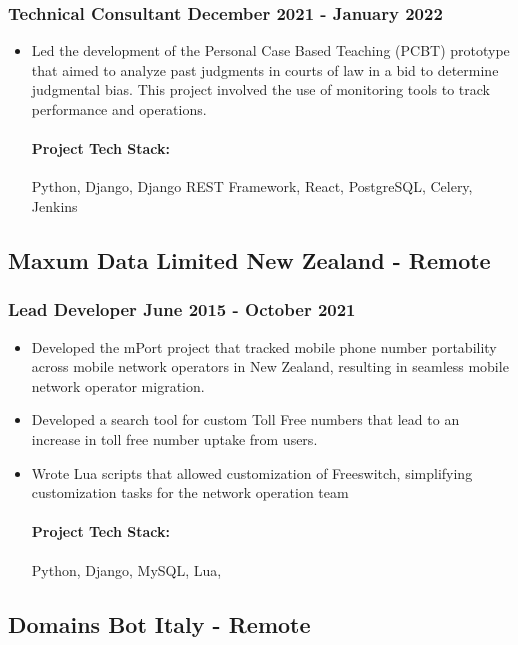 \documentclass[11pt]{article} %
\begin{document}
\subsubsection{Technical Consultant \hfill  December 2021 - January 2022}
\begin{itemize}
    \item Led the development of the Personal Case Based Teaching (PCBT) prototype that aimed to analyze past judgments in courts of law in a bid to determine judgmental bias. This project involved the use of monitoring tools to track performance and operations.

    \paragraph{Project Tech Stack:} Python, Django, Django REST Framework, React, PostgreSQL, Celery, Jenkins
\end{itemize}


\subsection{Maxum Data Limited \hfill New Zealand - Remote}
\subsubsection{Lead Developer \hfill  June 2015 - October 2021}
\begin{itemize}
    \item Developed the mPort project that tracked mobile phone number portability across mobile network operators in New Zealand, resulting in seamless mobile network operator migration.
    \item Developed a search tool for custom Toll Free numbers that lead to an increase in toll free number uptake from users.
    \item Wrote Lua scripts that allowed customization of Freeswitch, simplifying customization tasks for the network operation team 

    \paragraph{Project Tech Stack:} Python, Django, MySQL, Lua,
\end{itemize}

\subsection{Domains Bot \hfill Italy - Remote}
\end{document}

